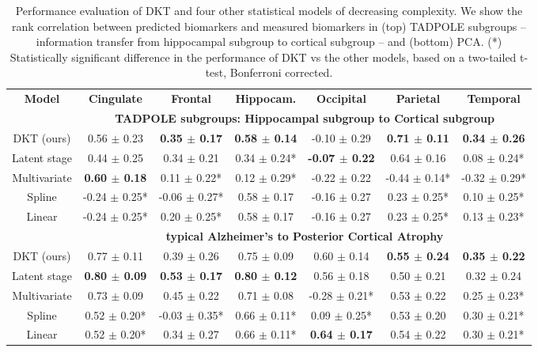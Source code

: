 \documentclass{llncs}
\begin{document}
\begin{table}
\centering
\fontsize{7}{10}\selectfont
\begin{tabular}{c | c c c c c c}
\textbf{Model} & \textbf{Cingulate} & \textbf{Frontal} & \textbf{Hippocam.} & \textbf{Occipital} & \textbf{Parietal} & \textbf{Temporal}\\
& \multicolumn{6}{c}{\textbf{TADPOLE subgroups: Hippocampal subgroup to Cortical subgroup}}\\
DKT (ours) &      0.56 $\pm$ 0.23 &    \textbf{0.35 $\pm$ 0.17} &        \textbf{0.58 $\pm$ 0.14} &     -0.10 $\pm$ 0.29 &     \textbf{0.71 $\pm$ 0.11} &     \textbf{0.34 $\pm$ 0.26} \\
Latent stage &      0.44 $\pm$ 0.25 &    0.34 $\pm$ 0.21 &       0.34 $\pm$ 0.24* &     \textbf{-0.07 $\pm$ 0.22} &     0.64 $\pm$ 0.16 &    0.08 $\pm$ 0.24* \\
Multivariate &      \textbf{0.60 $\pm$ 0.18} &   0.11 $\pm$ 0.22* &       0.12 $\pm$ 0.29* &     -0.22 $\pm$ 0.22 &   -0.44 $\pm$ 0.14* &   -0.32 $\pm$ 0.29* \\
Spline &    -0.24 $\pm$ 0.25* &  -0.06 $\pm$ 0.27* &        0.58 $\pm$ 0.17 &     -0.16 $\pm$ 0.27 &    0.23 $\pm$ 0.25* &    0.10 $\pm$ 0.25* \\
Linear &    -0.24 $\pm$ 0.25* &   0.20 $\pm$ 0.25* &        0.58 $\pm$ 0.17 &     -0.16 $\pm$ 0.27 &    0.23 $\pm$ 0.25* &    0.13 $\pm$ 0.23* \\
& \multicolumn{6}{c}{\textbf{typical Alzheimer's to Posterior Cortical Atrophy}}\\
DKT (ours) &    0.77 $\pm$ 0.11 &    0.39 $\pm$ 0.26 &      0.75 $\pm$ 0.09 &    0.60 $\pm$ 0.14 &    \textbf{0.55 $\pm$ 0.24} &    \textbf{0.35 $\pm$ 0.22} \\
Latent stage &    \textbf{0.80 $\pm$ 0.09} &    \textbf{0.53 $\pm$ 0.17} &      \textbf{0.80 $\pm$ 0.12} &    0.56 $\pm$ 0.18 &    0.50 $\pm$ 0.21 &    0.32 $\pm$ 0.24 \\
Multivariate &   0.73 $\pm$ 0.09 &   0.45 $\pm$ 0.22  &    0.71 $\pm$ 0.08 & -0.28 $\pm$ 0.21* &  0.53 $\pm$ 0.22  &  0.25 $\pm$ 0.23* \\
Spline &   0.52 $\pm$ 0.20* &  -0.03 $\pm$ 0.35* &     0.66 $\pm$ 0.11* &   0.09 $\pm$ 0.25* &    0.53 $\pm$ 0.20 &   0.30 $\pm$ 0.21* \\
Linear &   0.52 $\pm$ 0.20* &    0.34 $\pm$ 0.27 &     0.66 $\pm$ 0.11* &    \textbf{0.64 $\pm$ 0.17} &    0.54 $\pm$ 0.22 &   0.30 $\pm$ 0.21* \\
\end{tabular}
\vspace{0.5em}
\caption[Performance evaluation of DKT and other models]{Performance evaluation of DKT and four other statistical models of decreasing complexity. We show the rank correlation between predicted biomarkers and measured biomarkers in (top) TADPOLE subgroups -- information transfer from hippocampal subgroup to cortical subgroup -- and (bottom) PCA. (*) Statistically significant difference in the performance of DKT vs the other models, based on a two-tailed t-test, Bonferroni corrected.}
\label{sec:dktPerfMetrics}
\end{table}
\end{document}
